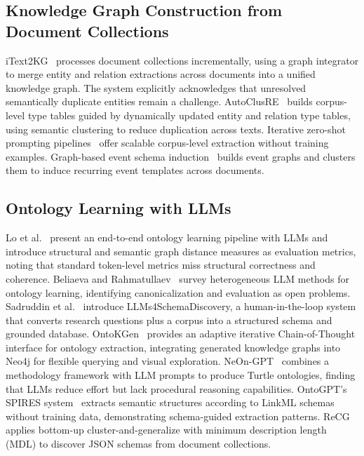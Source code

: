 \documentclass[runningheads,a4paper]{llncs}
\begin{document}
\subsection{Knowledge Graph Construction from Document Collections}

iText2KG~\cite{chen2024itext2kg} processes document collections
incrementally, using a graph integrator to merge entity and relation
extractions across documents into a unified knowledge graph. The system
explicitly acknowledges that unresolved semantically duplicate entities
remain a challenge. AutoClusRE~\cite{wang2024autoclusre} builds
corpus-level type tables guided by dynamically updated entity and
relation type tables, using semantic clustering to reduce duplication
across texts. Iterative zero-shot prompting
pipelines~\cite{kumar2023iterative} offer scalable corpus-level
extraction without training examples. Graph-based event schema
induction~\cite{liu2023graph} builds event graphs and clusters them to
induce recurring event templates across documents.

\subsection{Ontology Learning with LLMs}

Lo et al.~\cite{lo2024endtoend} present an end-to-end ontology learning
pipeline with LLMs and introduce structural and semantic graph distance
measures as evaluation metrics, noting that standard token-level metrics
miss structural correctness and coherence. Beliaeva and
Rahmatullaev~\cite{beliaeva2025} survey heterogeneous LLM methods for
ontology learning, identifying canonicalization and evaluation as open
problems. Sadruddin et al.~\cite{sadruddin2025} introduce
LLMs4SchemaDiscovery, a human-in-the-loop system that converts research
questions plus a corpus into a structured schema and grounded database.
OntoKGen~\cite{thompson2024ontokgen} provides an adaptive iterative
Chain-of-Thought interface for ontology extraction, integrating
generated knowledge graphs into Neo4j for flexible querying and visual
exploration. NeOn-GPT~\cite{brown2024neongpt} combines a methodology
framework with LLM prompts to produce Turtle ontologies, finding that
LLMs reduce effort but lack procedural reasoning capabilities. OntoGPT's
SPIRES system~\cite{mungall2023ontogpt} extracts semantic structures
according to LinkML schemas without training data, demonstrating
schema-guided extraction patterns. ReCG~\cite{johnson2024recg} applies
bottom-up cluster-and-generalize with minimum description length (MDL)
to discover JSON schemas from document collections.
\end{document}
